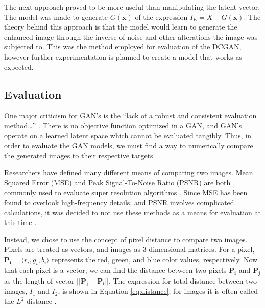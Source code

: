 \documentclass[letterpaper]{article} %
\begin{document}
The next approach proved to be more useful than manipulating the latent vector.
The model was made to generate $G(\mathbf{x})$ of
the expression $I_E = X - G(\mathbf{x})$. The theory behind this approach is that
the model would learn to generate the enhanced image through
the inverse of noise and other alterations the image was subjected to.
This was the method employed for evaluation of the DCGAN,
however further experimentation is planned to create a model
that works as expected.

\subsection{Evaluation}
One major criticism for GAN's is the
``lack of a robust and consistent evaluation method\dots''
\cite{gmm}.
There is no objective function optimized in a GAN,
and GAN's operate on a learned latent space
which cannot be evaluated tangibly.
Thus, in order to evaluate the GAN models,
we must find a way to numerically compare the generated images to their respective targets.

Researchers have defined many different means of comparing two images.
Mean Squared Error (MSE) and Peak Signal-To-Noise Ratio (PSNR)
are both commonly used to evaluate super resolution algorithms
\cite{super_resolution}.
Since MSE has been found to overlook high-frequency details,
and PSNR involves complicated calculations,
it was decided to not use these methods as a means for evaluation
at this time
\cite{srgan}.

Instead, we chose to use the concept of pixel distance
to compare two images.
Pixels are treated as vectors, and images as
3-dimensional matrices.
For a pixel,
$\mathbf{P_i} = \langle r_i,g_i,b_i \rangle$ represents
the red, green, and blue color values,
respectively.
Now that each pixel is a vector, we can find the distance between
two pixels $\mathbf{P_i}$ and $\mathbf{P_j}$ as the length of vector
$||\mathbf{P_j} - \mathbf{P_i}||$.
The expression for total distance between two images, $I_1$ and $I_2$, is
shown in Equation \ref{eq:distance};
for images it is often called the $L^2$ distance \cite{graphics}.
\end{document}
